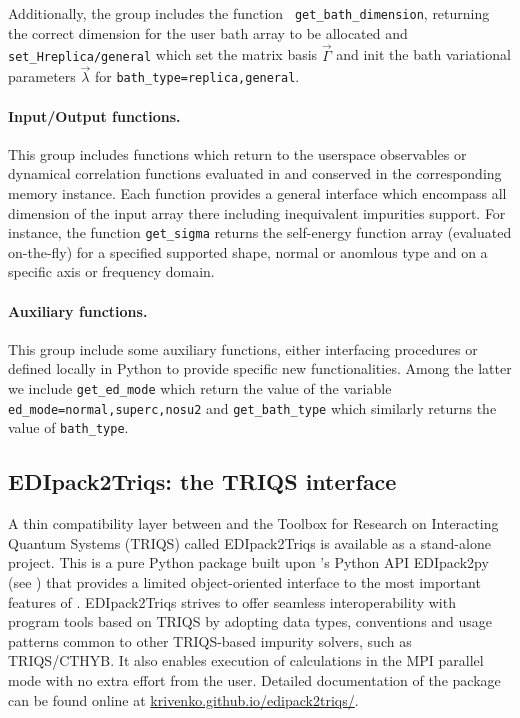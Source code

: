 \documentclass[edipack_sp.tex]{subfiles}
\begin{document}
Additionally, the group includes the function {\tt
  get\_bath\_dimension}, returning the correct
dimension for the user bath array to be allocated and {\tt
  set\_H{replica/general}} which set the matrix basis
$\vec{\Gamma}$ and init the bath variational parameters
$\vec{\lambda}$ for {\tt bath\_type=replica,general}. 




  
\paragraph{{\bf Input/Output functions}.}
This group includes functions which return to the userspace
observables or dynamical correlation functions evaluated in \NAME and
conserved in the corresponding memory instance. Each function
provides a general interface which encompass all dimension of the
input array there including inequivalent impurities support.
For instance, the function {\tt get\_sigma} returns the self-energy
function array (evaluated on-the-fly) for a specified supported shape,
normal or anomlous type and on a specific axis or frequency domain. 
    

\paragraph{{\bf Auxiliary functions}.}
This group include some auxiliary functions, either interfacing \NAME
procedures or defined locally in Python to provide specific new
functionalities. Among the latter we include {\tt get\_ed\_mode} which
return the value of the variable {\tt ed\_mode=normal,superc,nosu2}
and {\tt get\_bath\_type} which similarly returns the value of {\tt bath\_type}.









\subsection{EDIpack2Triqs: the TRIQS interface}\label{sSecInteropTRIQS}
A thin compatibility layer between \NAME and the Toolbox for Research on
Interacting Quantum Systems (TRIQS)\cite{Parcollet2015CPC} called EDIpack2Triqs
is available as a stand-alone project. This is a pure Python package
built upon \NAME's Python API EDIpack2py (see ) that provides a
limited object-oriented interface to the most important features of \NAME.
EDIpack2Triqs strives to offer seamless interoperability with program tools
based on TRIQS by adopting data types, conventions and usage patterns
common to other TRIQS-based impurity solvers, such as
TRIQS/CTHYB\cite{Seth2016CPC}. It also enables execution of \NAME calculations
in the MPI parallel mode with no extra effort from the user.
Detailed documentation of the package can be 
found online at \href{https://krivenko.github.io/edipack2triqs/}
{krivenko.github.io/edipack2triqs/}.
\end{document}
